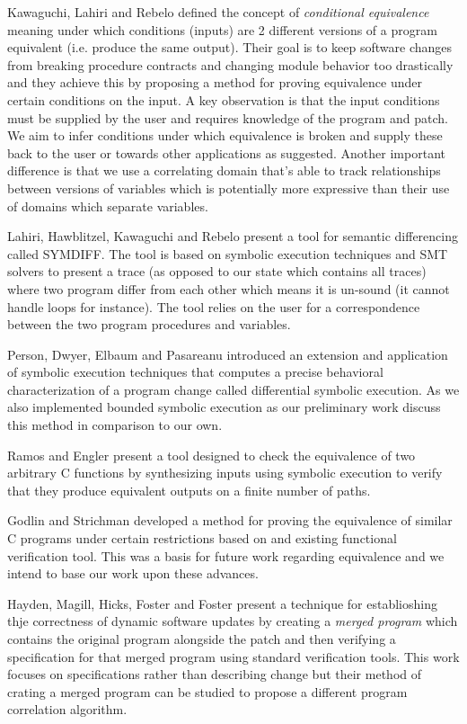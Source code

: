 Kawaguchi, Lahiri and Rebelo \cite{CondEqv} defined the concept of \textit{conditional equivalence} meaning under which conditions (inputs) are 2 different versions of a program equivalent (i.e. produce the same output). Their goal is to keep software changes from breaking procedure contracts and changing module behavior too drastically and they achieve this by proposing a method for proving equivalence under certain conditions on the input. A key observation is that the input conditions must be supplied by the user and requires knowledge of the program and patch. We aim to infer conditions under which equivalence is broken and supply these back to the user or towards other applications as suggested. Another important difference is that we use a correlating domain that's able to track relationships between versions of variables which is potentially more expressive than their use of domains which separate variables.

Lahiri, Hawblitzel, Kawaguchi and Rebelo \cite{SymDiff} present a tool for semantic differencing called SYMDIFF. The tool is based on symbolic execution techniques and SMT solvers to present a trace (as opposed to our state which contains all traces) where two program differ from each other which means it is un-sound (it cannot handle loops for instance). The tool relies on the user for a correspondence between the two program procedures and variables.

Person, Dwyer, Elbaum and Pasareanu \cite{DBLP:conf/sigsoft/PersonDEP08} introduced an extension and application of symbolic execution techniques that computes a precise behavioral characterization of a program change called differential symbolic execution. As we also implemented bounded symbolic execution as our preliminary work discuss this method in comparison to our own.

Ramos and Engler \cite{DBLP:conf/cav/RamosE11} present a tool designed to check the equivalence of two arbitrary C functions by synthesizing inputs using symbolic execution to verify that they produce equivalent outputs on a finite number of paths.

Godlin and Strichman \cite{DBLP:conf/dac/GodlinS09} developed a method for proving the equivalence of similar C programs under certain restrictions based on and existing functional verification tool. This was a basis for future work regarding equivalence and we intend to base our work upon these advances.

Hayden, Magill, Hicks, Foster and Foster \cite{DBLP:conf/vstte/HaydenMHFF12} present a technique for establioshing thje correctness of dynamic software updates by creating a \emph{merged program} which contains the original program alongside the patch and then verifying a specification for that merged program using standard verification tools. This work focuses on specifications rather than describing change but their method of crating a merged program can be studied to propose a different program correlation algorithm.

